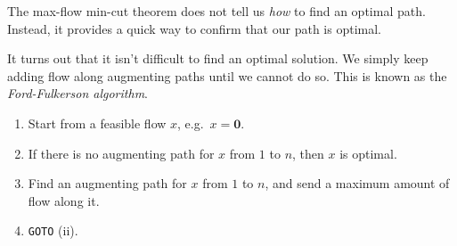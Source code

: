 \documentclass[a4paper]{article}
\begin{document}
The max-flow min-cut theorem does not tell us \emph{how} to find an optimal path. Instead, it provides a quick way to confirm that our path is optimal.

It turns out that it isn't difficult to find an optimal solution. We simply keep adding flow along augmenting paths until we cannot do so. This is known as the \emph{Ford-Fulkerson algorithm}.

\begin{enumerate}
  \item Start from a feasible flow $x$, e.g.\ $x = \mathbf{0}$.
  \item If there is no augmenting path for $x$ from $1$ to $n$, then $x$ is optimal.
  \item Find an augmenting path for $x$ from $1$ to $n$, and send a maximum amount of flow along it.
  \item \texttt{GOTO} (ii).
\end{enumerate}
\end{document}

